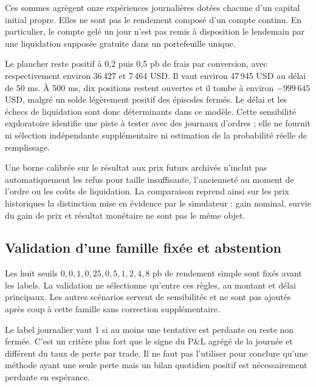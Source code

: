 Ces sommes agrègent onze expériences journalières dotées chacune d'un capital initial propre. Elles ne sont pas le rendement composé d'un compte continu. En particulier, le compte gelé un jour n'est pas remis à disposition le lendemain par une liquidation supposée gratuite dans un portefeuille unique.

\begin{table}[H]\centering\small

\caption{Sensibilité du filtre d'âge de 100 ms, montant de 100\,000 USD. Les quatre variantes supplémentaires constituent un suivi exploratoire après le premier résumé de test ; elles ne changent pas la famille de huit politiques soumise à validation. Le plancher inclut les USD récupérés et décote à zéro les inventaires résiduels.}
\end{table}

Le plancher reste positif à 0,2 puis 0,5 pb de frais par conversion, avec respectivement environ 36\,427 et 7\,464 USD. Il vaut environ 47\,945 USD au délai de 50 ms. À 500 ms, dix positions restent ouvertes et il tombe à environ $-999\,645$ USD, malgré un solde légèrement positif des épisodes fermés. Le délai et les échecs de liquidation sont donc déterminants dans ce modèle. Cette sensibilité exploratoire identifie une piste à tester avec des journaux d'ordres ; elle ne fournit ni sélection indépendante supplémentaire ni estimation de la probabilité réelle de remplissage.

Une borne calibrée sur le résultat aux prix futurs archivés n'inclut pas automatiquement les refus pour taille insuffisante, l'ancienneté au moment de l'ordre ou les coûts de liquidation. La comparaison reprend ainsi sur les prix historiques la distinction mise en évidence par le simulateur : gain nominal, survie du gain de prix et résultat monétaire ne sont pas le même objet.

\subsection{Validation d'une famille fixée et abstention}

Les huit seuils \(0,0{,}1,0{,}25,0{,}5,1,2,4,8\) pb de rendement simple sont fixés avant les labels. La validation ne sélectionne qu'entre ces règles, au montant et délai principaux. Les autres scénarios servent de sensibilités et ne sont pas ajoutés après coup à cette famille sans correction supplémentaire.

Le label journalier vaut 1 si au moins une tentative est perdante ou reste non fermée. C'est un critère plus fort que le signe du P\&L agrégé de la journée et différent du taux de perte par trade. Il ne faut pas l'utiliser pour conclure qu'une méthode ayant une seule perte mais un bilan quotidien positif est nécessairement perdante en espérance.

